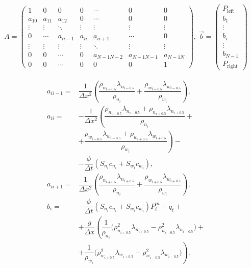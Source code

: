 \begin{equation} \label{eq:p_matrix}
\begin{aligned}
A = \begin{pmatrix}
1 & 0 & 0 & 0 & \cdots & 0 & 0 \\
a_{10} & a_{11} & a_{12} & 0 & \cdots & 0 & 0 \\
\vdots & \vdots & \ddots & \vdots & \vdots & \vdots & \vdots \\
0 & \cdots & a_{ii-1} & a_{ii} & a_{ii+1} & \cdots & 0 \\
\vdots & \vdots & \vdots & \vdots & \ddots & \vdots & \vdots\\
0 & 0 & \cdots & 0 & a_{N-1 N-2} & a_{N-1 N-1} & a_{N-1 N} \\
0 & 0 & \cdots & 0 & 0 & 0 & 1
\end{pmatrix}, \;
\vec{b} = \begin{pmatrix}
P_{\text{left}} \\
b_1 \\
\vdots \\
b_i \\
\vdots \\
b_{N-1} \\
P_{\text{right}}
\end{pmatrix}
\end{aligned}
\end{equation}

\begin{equation} \label{eq:p_matrix_i}
\begin{aligned}
a_{ii-1} = & \dfrac{1}{\Delta x^2} \left(\dfrac{\rho_{n_{i-0.5}} \lambda_{n_{i-0.5}}}{\rho_{n_i}} + \dfrac{\rho_{w_{i-0.5}} \lambda_{w_{i-0.5}}}{\rho_{w_i}} \right), \\
 a_{ii} = & -\dfrac{1}{\Delta x^2} \left( \dfrac{\rho_{n_{i-0.5}} \lambda_{n_{i-0.5}} + \rho_{n_{i+0.5}} \lambda_{n_{i+0.5}}}{\rho_{n_i}} + \right.\\
 & + \left. \dfrac{\rho_{w_{i-0.5}} \lambda_{w_{i-0.5}} + \rho_{w_{i+0.5}} \lambda_{w_{i+0.5}}}{\rho_{w_i}} \right) - \\
& - \dfrac{\phi}{\Delta t} (S_{n_i}c_{n_i}+S_{w_i}c_{w_i}), \\
a_{ii+1} = & \dfrac{1}{\Delta x^2} \left(\dfrac{\rho_{n_{i+0.5}} \lambda_{n_{i+0.5}}}{\rho_{n_i}} + \dfrac{\rho_{w_{i+0.5}} \lambda_{w_{i+0.5}}}{\rho_{w_i}} \right), \\
b_i = & - \dfrac{\phi}{\Delta t} (S_{n_i}c_{n_i}+S_{w_i}c_{w_i})P_i^m - q_t + \\
  & + \dfrac{g}{\Delta x} \left(\dfrac{1}{\rho_{n_i}} \big( \rho_{n_{i+0.5}}^2 \lambda_{n_{i+0.5}} - \rho_{n_{i-0.5}}^2 \lambda_{n_{i-0.5}} \big) + \right.\\
  & \left. + \dfrac{1}{\rho_{w_i}} \big( \rho_{w_{i+0.5}}^2 \lambda_{w_{i+0.5}} - \rho_{w_{i-0.5}}^2 \lambda_{w_{i-0.5}} \big)\right).
\end{aligned}
\end{equation}

